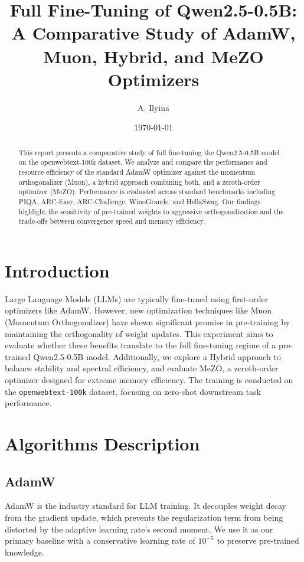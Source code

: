\documentclass{article}
\title{Full Fine-Tuning of Qwen2.5-0.5B: \\ A Comparative Study of AdamW, Muon, Hybrid, and MeZO Optimizers}
\author{A. Ilyina}
\date{\today}
\begin{document}
\maketitle

\begin{abstract}
This report presents a comparative study of full fine-tuning the Qwen2.5-0.5B model on the openwebtext-100k dataset. We analyze and compare the performance and resource efficiency of the standard AdamW optimizer against the momentum orthogonalizer (Muon), a hybrid approach combining both, and a zeroth-order optimizer (MeZO). Performance is evaluated across standard benchmarks including PIQA, ARC-Easy, ARC-Challenge, WinoGrande, and HellaSwag. Our findings highlight the sensitivity of pre-trained weights to aggressive orthogonalization and the trade-offs between convergence speed and memory efficiency.
\end{abstract}

\section{Introduction}
Large Language Models (LLMs) are typically fine-tuned using first-order optimizers like AdamW. However, new optimization techniques like Muon (Momentum Orthogonalizer) have shown significant promise in pre-training by maintaining the orthogonality of weight updates. This experiment aims to evaluate whether these benefits translate to the full fine-tuning regime of a pre-trained Qwen2.5-0.5B model. Additionally, we explore a Hybrid approach to balance stability and spectral efficiency, and evaluate MeZO, a zeroth-order optimizer designed for extreme memory efficiency. The training is conducted on the \texttt{openwebtext-100k} dataset, focusing on zero-shot downstream task performance.

\section{Algorithms Description}

\subsection{AdamW}
AdamW is the industry standard for LLM training. It decouples weight decay from the gradient update, which prevents the regularization term from being distorted by the adaptive learning rate's second moment. We use it as our primary baseline with a conservative learning rate of $10^{-5}$ to preserve pre-trained knowledge.
\end{document}
